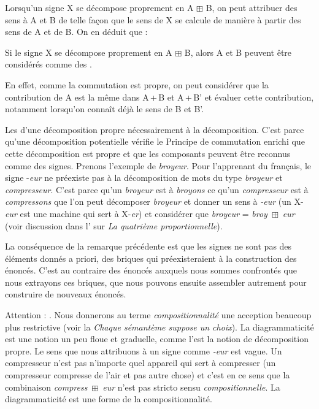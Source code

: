 Lorsqu’un signe X se décompose proprement en A ${\boxplus}$ B, on peut attribuer des sens à A et B de telle façon que le sens de X se calcule de manière  à partir des sens de A et de B. On en déduit que :

{Si le signe X se décompose proprement en A ${\boxplus}$ B, alors A et B peuvent être considérés comme des .}

 En effet, comme la commutation est propre, on peut considérer que la contribution de A est la même dans A\,+\,B et A\,+\,B’ et évaluer cette contribution, notamment lorsqu’on connaît déjà le sens de B et B’.

Les  d’une décomposition propre  nécessairement à la décomposition. C’est parce qu’une décomposition potentielle vérifie le Principe de commutation enrichi que cette décomposition est propre et que les composants peuvent être reconnus comme des signes. Prenons l’exemple de \textit{broyeur}. Pour l’apprenant du français, le signe -\textit{eur} ne préexiste pas à la décomposition de mots du type \textit{broyeur} et \textit{compresseur}. C’est parce qu’un \textit{broyeur} est à \textit{broyons} ce qu’un \textit{compresseur} est à \textit{compressons} que l’on peut décomposer \textit{broyeur} et donner un sens à \textit{{}-eur} (un X-\textit{eur} est une machine qui sert à X-\textit{er}) et considérer que \textit{broyeur} = \textit{broy}~${\boxplus}$~\textit{eur} (voir discussion dans l’ sur \textit{La quatrième proportionnelle}).

La conséquence de la remarque précédente est que les signes ne sont pas des éléments donnés a priori, des briques qui préexisteraient à la construction des énoncés. C’est au contraire des énoncés auxquels nous sommes confrontés que nous extrayons ces briques, que nous pouvons ensuite assembler autrement pour construire de nouveaux énoncés.

Attention : . Nous donnerons au terme \textit{compositionnalité} une acception beaucoup plus restrictive (voir la  \textit{Chaque sémantème suppose un choix}). La diagrammaticité est une notion un peu floue et graduelle, comme l’est la notion de décomposition propre. Le sens que nous attribuons à un signe comme \textit{{}-eur} est vague. Un compresseur n’est pas n’importe quel appareil qui sert à compresser (un compresseur compresse de l’air et pas autre chose) et c’est en ce sens que la combinaison \textit{compress}~${\boxplus}$~\textit{eur} n’est pas stricto sensu \textit{compositionnelle}. La diagrammaticité est une forme  de la compositionnalité.

